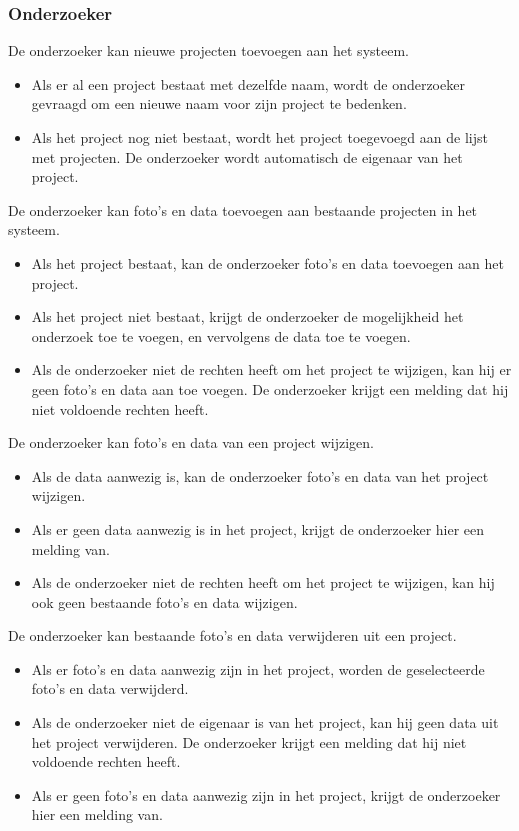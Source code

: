 \subsubsection{Onderzoeker}

De onderzoeker kan nieuwe projecten toevoegen aan het systeem.
\begin{itemize}
	\item Als er al een project bestaat met dezelfde naam, wordt de onderzoeker gevraagd om een nieuwe naam voor zijn project te bedenken.
	\item Als het project nog niet bestaat, wordt het project toegevoegd aan de lijst met projecten. De onderzoeker wordt automatisch de eigenaar van het project.
\end{itemize}

De onderzoeker kan foto's en data toevoegen aan bestaande projecten in het systeem.
\begin{itemize}
	\item Als het project bestaat, kan de onderzoeker foto's en data toevoegen aan het project.
	\item Als het project niet bestaat, krijgt de onderzoeker de mogelijkheid het onderzoek toe te voegen, en vervolgens de data toe te voegen.
	\item Als de onderzoeker niet de rechten heeft om het project te wijzigen, kan hij er geen foto's en data aan toe voegen. De onderzoeker krijgt een melding dat hij niet voldoende rechten heeft.
\end{itemize}

De onderzoeker kan foto's en data van een project wijzigen.
\begin{itemize}
	\item Als de data aanwezig is, kan de onderzoeker foto's en data van het project wijzigen.
  \item Als er geen data aanwezig is in het project, krijgt de onderzoeker hier een melding van.
	\item Als de onderzoeker niet de rechten heeft om het project te wijzigen, kan hij ook geen bestaande foto's en data wijzigen.
\end{itemize}

De onderzoeker kan bestaande foto's en data verwijderen uit een project.
\begin{itemize}
	\item Als er foto's en data aanwezig zijn in het project, worden de geselecteerde foto's en data verwijderd.
	\item Als de onderzoeker niet de eigenaar is van het project, kan hij geen data uit het project verwijderen. De onderzoeker krijgt een melding dat hij niet voldoende rechten heeft. 
	\item Als er geen foto's en data aanwezig zijn in het project, krijgt de onderzoeker hier een melding van.
\end{itemize}

